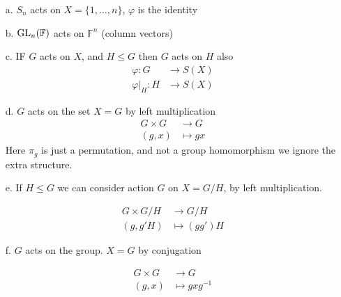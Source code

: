 \documentclass[11pt,leqno,oneside]{amsart}
\newcommand{\lambdadeclaration}[4]{
  \begin{align*}
              #1 &\to #2\\
              #3 &\mapsto #4
  \end{align*}
}
\begin{document}
\begin{example}[1.5.4]
  \begin{enumerate}
    \item[a.] \(S_n\) acts on \(X=\{1,\ldots,n\}\), \(\varphi\) is the identity
    \item[b.] \(\operatorname{GL}_n(\mathbb{F})\) acts on \(\mathbb{F}^n\) (column vectors)
    \item[c.] IF \(G\) acts on \(X\), and \(H \le G\) then \(G\) acts on \(H\) also
      \begin{align*}
        \varphi \colon G &\to S(X)\\
        \varphi|_H \colon H &\to S(X)
      \end{align*}
    \item[d.] \(G\) acts on the set \(X=G\) by left multiplication
      \begin{align*}
        G \times G &\to G\\
        (g,x) &\mapsto gx
      \end{align*}
      Here \(\pi_g\) is just a permutation, and not a group homomorphism we ignore the extra structure.
    \item[e.] If \(H \le G\) we can consider action \(G\) on \(X=G/H\), by left multiplication.
      \lambdadeclaration{G\times G/H}{G/H}{(g,g'H)}{(gg')H}
    \item[f.] \(G\) acts on the group. \(X=G\) by conjugation
      \lambdadeclaration{G \times G}{G}{(g,x)}{gxg^{-1}}
  \end{enumerate}
\end{example}
\end{document}
